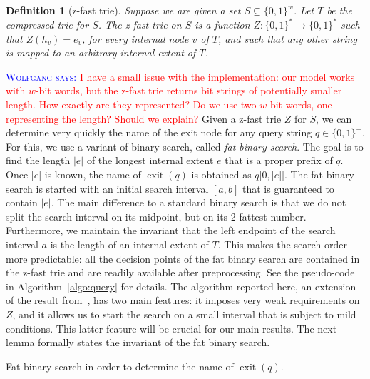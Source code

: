 \documentclass[a4paper,11pt]{article}
\newtheorem{definition}[theorem]{Definition}
\newcommand{\eps}{\varepsilon}
\newcommand{\?}{\mskip1.5mu}
\DeclareMathOperator{\exit}{exit}
\newcommand{\aremark}[3]{\textcolor{blue}{\textsc{#1 #2:}}
  \textcolor{red}{\textsf{#3}}}
\newcommand{\wolfgang}[2][says]{\aremark{Wolfgang}{#1}{#2}}
\begin{document}
\begin{definition}[z-fast trie]
Suppose we are given a set $S \subseteq \{0, 1\}^w$. Let $T$ be the 
compressed trie for $S$. The \emph{z-fast trie on $S$} is 
a function $Z : \{0, 1\}^* \rightarrow \{0, 1\}^*$ such that 
$Z(h_v) = e_v$, for every internal node $v$ of $T$, and such
that any other string is mapped to an arbitrary internal extent
of $T$.
\end{definition}

\wolfgang{I have a small issue with the implementation:
our model works with $w$-bit words, but the z-fast trie
returns bit strings of potentially smaller length.
How exactly are they represented? Do we use two $w$-bit
words, one representing the length? Should we explain?}
Given a z-fast trie $Z$ for $S$, we can determine very 
quickly the name of the exit node for any query string $q \in \{0,1\}^+$.
For this, we use a variant of binary search, called 
\emph{fat binary search}.
The goal is to find the length $|e|$ of the 
longest internal extent $e$ that is a proper 
prefix of $q$. Once $|e|$ is known, the name 
of $\exit(q)$ is obtained as $q\big[0, |e|\big]$.
The fat binary search is started with an initial
search interval $[a,b]$ that is guaranteed
to contain $|e|$. The main difference to
a standard binary search is that we do
not split the search interval on its
midpoint, but on its 2-fattest number.
Furthermore, we maintain the invariant
that the left endpoint of the search interval $a$ 
is the length of an internal extent
of $T$.  This makes the search order more
predictable: all the decision points of the
fat binary search are contained in the z-fast trie
and are readily available after preprocessing.
See the pseudo-code in Algorithm~\ref{algo:query} for details. 
The algorithm reported here, an extension of the 
result from~\cite{BelazzouguiBoVi10}, has two main features:
it imposes very weak requirements on $Z$, and it allows us to start 
the search on a small interval that is subject to
mild conditions. This latter feature will be crucial 
for our main results. The next lemma formally states
the invariant of the fat binary search.

\begin{algorithm}
\KwOut{the name of $\exit(q)$}
\If{$a = 0 \wedge e_\text{root}\neq\eps$}{%
  \Return $\eps$\;
} 
\caption{Fat binary search in order to 
  determine the name of $\exit(q)$.}
\label{algo:query}
\end{algorithm}
\end{document}
